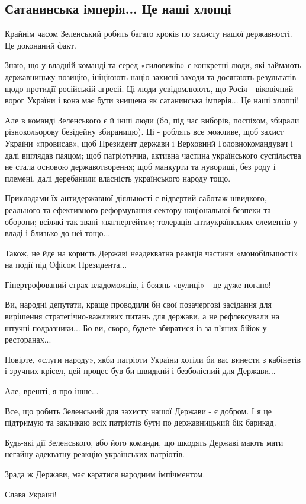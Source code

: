  
 
 
 
 

\subsection{Сатанинська імперія... Це наші хлопці}
\label{sec:28_03_2021.jarosh_dmitrij.1.rossia_zelja}

Крайнім часом Зеленський робить багато кроків по захисту нашої державності. Це доконаний факт.

Знаю, що у владній команді та серед «силовиків» є конкретні люди, які займають
державницьку позицію, ініціюють націо-захисні заходи та досягають результатів
щодо протидії російській агресіі. Ці люди усвідомлюють, що Росія - віковічний
ворог України і вона має бути знищена як сатанинська імперія... Це наші хлопці!

Але в команді Зеленського є й інші люди (бо, під час виборів, поспіхом, збирали
різнокольорову безідейну збираницю). Ці - роблять все можливе, щоб захист
України «провисав», щоб Президент держави і Верховний Головнокомандувач і далі
виглядав паяцом; щоб патріотична, активна частина українського суспільства не
стала основою державотворення; щоб манкурти та нувориші, без роду і племені,
далі деребанили власність українського народу тощо.

Прикладами їх антидержавної діяльності є відвертий саботаж швидкого, реального
та ефективного реформування сектору національної безпеки та оборони; всілякі
так звані «вагнергейти»; толерація антиукраїнських елементів у владі і близько
до неї тощо...

Також, не йде на користь Державі неадекватна реакція частини «монобільшості» на події під Офісом Президента... 

Гіпертрофований страх владоможців, і боязнь «вулиці» - це дуже погано!

Ви, народні депутати, краще проводили би свої позачергові засідання для
вирішення стратегічно-важливих питань для держави, а не рефлексували на штучні
подразники... Бо ви, скоро,  будете збиратися із-за п’яних бійок у
ресторанах...

Повірте, «слуги народу», якби патріоти України хотіли би вас винести з
кабінетів і зручних крісел, цей процес був би швидкий і безболісний для
Держави...

Але, врешті, я про інше... 

Все, що робить Зеленський для захисту нашої Держави - є добром. І я це
підтримую та закликаю всіх патріотів бути по державницький бік барикад.

Будь-які дії Зеленського, або його команди, що шкодять Державі мають мати
негайну адекватну реакцію українських патріотів.

Зрада ж Держави, має каратися народним імпічментом.

Слава Україні!
